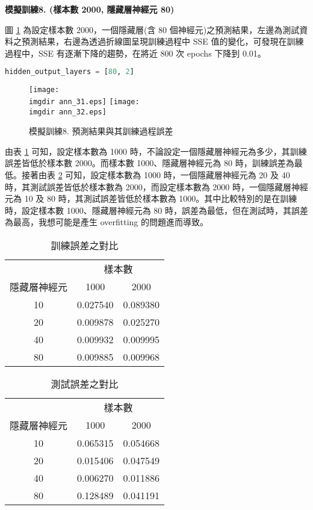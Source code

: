 \textbf{\large 模擬訓練8. (樣本數 2000, 隱藏層神經元 80)}

圖 \ref{fig:ann_15} 為設定樣本數 2000，一個隱藏層(含 80 個神經元)之預測結果，左邊為測試資料之預測結果，右邊為透過折線圖呈現訓練過程中 SSE 值的變化，可發現在訓練過程中，SSE 有逐漸下降的趨勢，在將近 800 次 epochs 下降到 0.01。
\bigskip
\begin{lstlisting}[language = Python]
hidden_output_layers = [80, 2] 
\end{lstlisting}
\begin{figure}[H]
	\centering
	\texttt{[image: \\imgdir ann\_31.eps]}
	\texttt{[image: \\imgdir ann\_32.eps]}
	\caption{模擬訓練8. 預測結果與其訓練過程誤差}
	 \label{fig:ann_15}
\end{figure}
\newpage
由表 \ref{tb:ann_2} 可知，設定樣本數為 1000 時，不論設定一個隱藏層神經元為多少，其訓練誤差皆低於樣本數 2000。而樣本數 1000、隱藏層神經元為 80 時，訓練誤差為最低。接著由表 \ref{tb:ann_3} 可知，設定樣本數為 1000 時，一個隱藏層神經元為 20 及 40 時，其測試誤差皆低於樣本數為 2000，而設定樣本數為 2000 時，一個隱藏層神經元為 10 及 80 時，其測試誤差皆低於樣本數為 1000。其中比較特別的是在訓練時，設定樣本數 1000、隱藏層神經元為 80 時，誤差為最低，但在測試時，其誤差為最高，我想可能是產生 overfitting 的問題進而導致。

\begin{table}[H] 
\centering
\caption{訓練誤差之對比}\label{tb:ann_2}
\tabcolsep=12pt
\begin{tabular}{ccc} 
\toprule
& \multicolumn{2}{c}{樣本數}\\
\cmidrule(l){2-3}
隱藏層神經元 & 1000 & 2000 \\[3pt]
\midrule
10 & \cellcolor{red!25}0.027540 & 0.089380 \\[3pt]
20 & \cellcolor{red!25}0.009878 & 0.025270 \\[3pt]
40 & \cellcolor{red!25}0.009932 & 0.009995 \\[3pt]
80 & \cellcolor{red!25}0.009885 & 0.009968 \\
\bottomrule
\end{tabular}
\end{table}\bigskip
\begin{table}[H] 
\centering
\caption{測試誤差之對比}\label{tb:ann_3}
\tabcolsep=12pt
\begin{tabular}{ccc} 
\toprule
& \multicolumn{2}{c}{樣本數}\\
\cmidrule(l){2-3}
隱藏層神經元 & 1000 & 2000 \\[3pt]
\midrule
10 & 0.065315 & \cellcolor{red!25}0.054668 \\[3pt]
20 & \cellcolor{red!25}0.015406 & 0.047549 \\[3pt]
40 & \cellcolor{red!25}0.006270 & 0.011886 \\[3pt]
80 & 0.128489 & \cellcolor{red!25}0.041191 \\
\bottomrule
\end{tabular}
\end{table}
